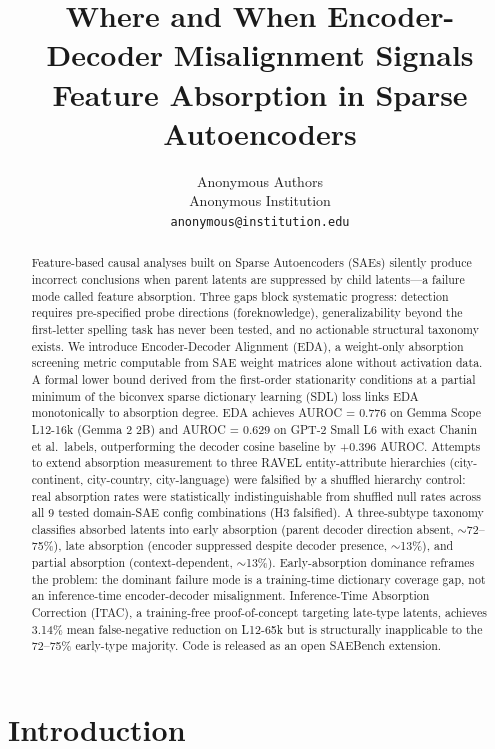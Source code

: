 \documentclass{article}
\title{Where and When Encoder-Decoder Misalignment Signals Feature Absorption in Sparse Autoencoders}
\author{%
  Anonymous Authors \\
  Anonymous Institution \\
  \texttt{anonymous@institution.edu} \\
}
\begin{document}
\maketitle

\begin{abstract}
Feature-based causal analyses built on Sparse Autoencoders (SAEs) silently produce incorrect conclusions when parent latents are suppressed by child latents---a failure mode called feature absorption. Three gaps block systematic progress: detection requires pre-specified probe directions (foreknowledge), generalizability beyond the first-letter spelling task has never been tested, and no actionable structural taxonomy exists. We introduce Encoder-Decoder Alignment (EDA), a weight-only absorption screening metric computable from SAE weight matrices alone without activation data. A formal lower bound derived from the first-order stationarity conditions at a partial minimum of the biconvex sparse dictionary learning (SDL) loss links EDA monotonically to absorption degree. EDA achieves AUROC = 0.776 on Gemma Scope L12-16k (Gemma 2 2B) and AUROC = 0.629 on GPT-2 Small L6 with exact Chanin et al.\ labels, outperforming the decoder cosine baseline by +0.396 AUROC. Attempts to extend absorption measurement to three RAVEL entity-attribute hierarchies (city-continent, city-country, city-language) were falsified by a shuffled hierarchy control: real absorption rates were statistically indistinguishable from shuffled null rates across all 9 tested domain-SAE config combinations (H3 falsified). A three-subtype taxonomy classifies absorbed latents into early absorption (parent decoder direction absent, $\sim$72--75\%), late absorption (encoder suppressed despite decoder presence, $\sim$13\%), and partial absorption (context-dependent, $\sim$13\%). Early-absorption dominance reframes the problem: the dominant failure mode is a training-time dictionary coverage gap, not an inference-time encoder-decoder misalignment. Inference-Time Absorption Correction (ITAC), a training-free proof-of-concept targeting late-type latents, achieves 3.14\% mean false-negative reduction on L12-65k but is structurally inapplicable to the 72--75\% early-type majority. Code is released as an open SAEBench extension.
\end{abstract}

\section{Introduction}
\end{document}
